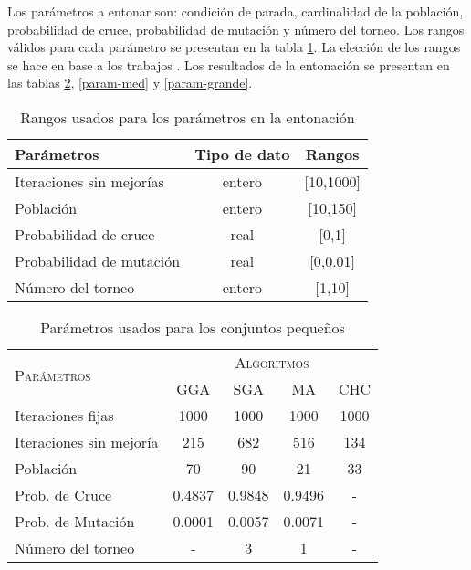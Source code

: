 Los parámetros a entonar son: condición de parada, cardinalidad de la población, probabilidad de cruce, probabilidad de mutación y número del torneo. Los rangos válidos para cada parámetro se presentan en la tabla \ref{rangos}. La elección de los rangos se hace en base a los trabajos \cite{de2004reduccion,de2004reduccion,garcia2012prototype,garcia2008memetic,talbi2009metaheuristics}. Los resultados de la entonación se presentan en las tablas \ref{param-peq}, \ref{param-med} y \ref{param-grande}.

\begin{table}[]
\centering
\begin{tabular}{l c c}
\hline
Parámetros & Tipo de dato & Rangos \\
\hline
\hline
Iteraciones sin mejorías & entero           &  [10,1000]       \\
Población                & entero           &  [10,150]       \\
Probabilidad de cruce    & real             &  [0,1]          \\
Probabilidad de mutación & real             &  [0,0.01]      \\
Número del torneo        & entero           &  [1,10]         \\  

\hline
\end{tabular}
\caption{Rangos usados para los parámetros en la entonación}
\label{rangos}
\end{table}

\begin{table}[]
\centering
\begin{tabular}{l c c c c}
\hline
\multirow{2}{*}{\textsc{Parámetros}}
	& \multicolumn{4}{c}{\textsc{Algoritmos}} \\
	& GGA & SGA & MA & CHC \\
\hline
\hline
Iteraciones fijas       &  1000    &  1000    &  1000      &  1000 \\
Iteraciones sin mejoría &  215     &    682   &    516     &  134  \\
Población               &    70    &    90    &    21      &    33 \\
Prob. de Cruce          &   0.4837 &   0.9848 &     0.9496 &     - \\
Prob. de Mutación       &   0.0001 &  0.0057  &     0.0071 &     - \\
Número del torneo       &   -      &    3     &     1      &     - \\
\hline
\end{tabular}
\caption{Parámetros usados para los conjuntos pequeños}
\label{param-peq}
\end{table}


